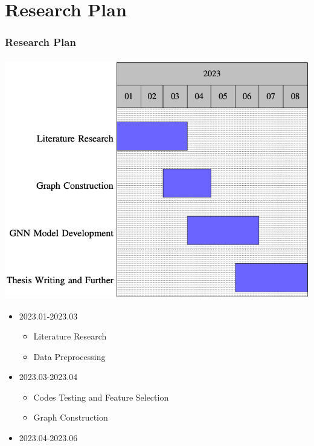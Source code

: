 \documentclass[light]{lutbeamer} %
\begin{document}
\section{Research Plan}
\begin{frame}
    \frametitle{Research Plan}
    \framesubtitle{}
    \begin{minipage}[c]{0.45\textwidth}
        \includegraphics[width=\textwidth]{figures/Gannt.png}
    \end{minipage}
    \hfill
    \begin{minipage}[c]{0.45\textwidth}
        \begin{itemize}
            \item \alert{2023.01-2023.03}
                  \begin{itemize}
                      \item Literature Research
                      \item Data Preprocessing
                  \end{itemize}
            \item \alert{2023.03-2023.04}
                  \begin{itemize}
                      \item Codes Testing and Feature Selection
                      \item Graph Construction
                  \end{itemize}
            \item \alert{2023.04-2023.06}
                  \begin{itemize}

\end{itemize}
\end{itemize}
\end{minipage}
\end{frame}
\end{document}
